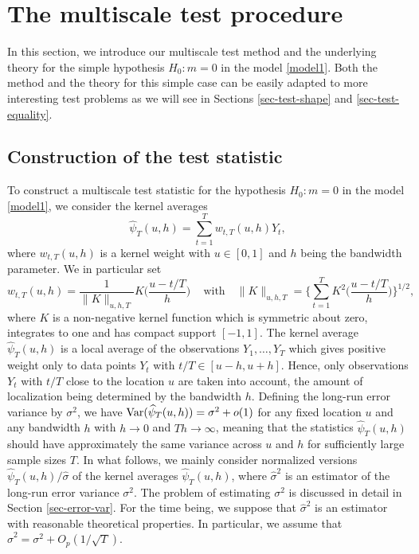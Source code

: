 \documentclass[a4paper,12pt]{article}
\numberwithin{equation}{section}
\begin{document}
\section{The multiscale test procedure}\label{sec-method}


In this section, we introduce our multiscale test method and the underlying theory for the simple hypothesis $H_0: m = 0$ in the model \eqref{model1}. Both the method and the theory for this simple case can be easily adapted to more interesting test problems as we will see in Sections \ref{sec-test-shape} and \ref{sec-test-equality}. 


\subsection{Construction of the test statistic}\label{subsec-method-stat}


To construct a multiscale test statistic for the hypothesis $H_0: m = 0$ in the model \eqref{model1}, we consider the kernel averages
\begin{equation}\label{kernel-ave}
\widehat{\psi}_T(u,h) = \sum\limits_{t=1}^T w_{t,T}(u,h) Y_t, 
\end{equation}
where $w_{t,T}(u,h)$ is a kernel weight with $u \in [0,1]$ and $h$ being the bandwidth parameter. We in particular set 
\[ w_{t,T}(u,h) = \frac{1}{\|K\|_{u,h,T}} K\Big( \frac{u - t/T}{h} \Big) \, \quad \text{with} \quad \|K\|_{u,h,T} = \Big\{\sum\limits_{t=1}^T  K^2\Big( \frac{u - t/T}{h} \Big)\Big\}^{1/2}, \]
where $K$ is a non-negative kernel function which is symmetric about zero, integrates to one and has compact support $[-1,1]$. The kernel average $\widehat{\psi}_T(u,h)$ is a local average of the observations $Y_1,\ldots,Y_T$ which gives positive weight only to data points $Y_t$ with $t/T \in [u-h,u+h]$. Hence, only observations $Y_t$ with $t/T$ close to the location $u$ are taken into account, the amount of localization being determined by the bandwidth $h$. Defining the long-run error variance by $\sigma^2$, we have $\textnormal{Var}(\widehat{\psi}_T(u,h)) = \sigma^2 + o(1)$ for any fixed location $u$ and any bandwidth $h$ with $h \rightarrow 0$ and $Th \rightarrow \infty$, meaning that the statistics $\widehat{\psi}_T(u,h)$ should have approximately the same variance across $u$ and $h$ for sufficiently large sample sizes $T$. In what follows, we mainly consider normalized versions $\widehat{\psi}_T(u,h)/\widehat{\sigma}$ of the kernel averages $\widehat{\psi}_T(u,h)$, where $\widehat{\sigma}^2$ is an estimator of the long-run error variance $\sigma^2$. The problem of estimating $\sigma^2$ is discussed in detail in Section \ref{sec-error-var}. For the time being, we suppose that $\widehat{\sigma}^2$ is an estimator with reasonable theoretical properties. In particular, we assume that $\widehat{\sigma}^2 = \sigma^2 + O_p(1/\sqrt{T})$. 
\end{document}
